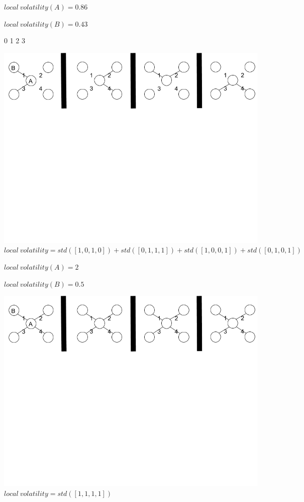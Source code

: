 \documentclass[oneside,12pt]{Classes/RoboticsLaTeX}
\begin{document}
\begin{appendices}
\begin{center}
$local\ volatility(A) = 0.86$

$local\ volatility(B) = 0.43$
\end{center}
\begin{center}
0     1     2     3

\includegraphics[trim={0 15cm 0 0}, width=140mm]{./Figures/volatilityAppendix3.png}
$local\ volatility = std([1,0,1,0]) + std([0,1,1,1]) + std([1,0,0,1]) + std([0,1,0,1])$

$local\ volatility(A) = 2$

$local\ volatility(B) = 0.5$
\end{center}
\begin{center}
\includegraphics[trim={0 15cm 0 0}, width=140mm]{./Figures/volatilityAppendix4.png}
$local\ volatility = std([1,1,1,1])$


\end{center}
\end{appendices}
\end{document}
